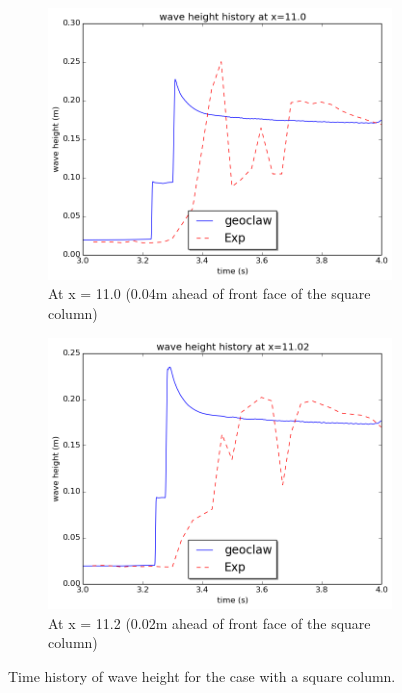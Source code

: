 \documentclass[11pt]{article}
\begin{document}
\begin{figure}[h!]
    \centering
    \begin{subfigure}[b]{0.4\textwidth}
        \includegraphics[width=1\textwidth]{./plots/waveheight_square_x11}
        \caption{At x = 11.0 (0.04m ahead of front face of the square column)}
        \label{fig:waveheight_square_x=11.0}
    \end{subfigure}
    \begin{subfigure}[b]{0.4\textwidth}
        \includegraphics[width=1\textwidth]{./plots/waveheight_square_x1102}
        \caption{At x = 11.2 (0.02m ahead of front face of the square column)}
        \label{fig:waveheight_square_x=11.02}
    \end{subfigure}
    \caption{Time history of wave height for the case with a square column.}
\end{figure}
\end{document}
